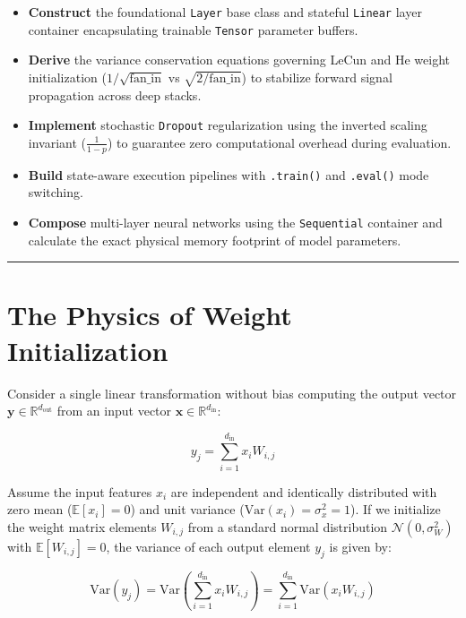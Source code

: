 \documentclass[
  letterpaper,
]{scrbook}
\providecommand{\tightlist}{%
  \setlength{\itemsep}{0pt}\setlength{\parskip}{0pt}}
\begin{document}
\begin{itemize}
\tightlist
\item
  \textbf{Construct} the foundational \texttt{Layer} base class and
  stateful \texttt{Linear} layer container encapsulating trainable
  \texttt{Tensor} parameter buffers.
\item
  \textbf{Derive} the variance conservation equations governing LeCun
  and He weight initialization (\(1/\sqrt{\text{fan\_in}}\) vs
  \(\sqrt{2/\text{fan\_in}}\)) to stabilize forward signal propagation
  across deep stacks.
\item
  \textbf{Implement} stochastic \texttt{Dropout} regularization using
  the inverted scaling invariant (\(\frac{1}{1-p}\)) to guarantee zero
  computational overhead during evaluation.
\item
  \textbf{Build} state-aware execution pipelines with \texttt{.train()}
  and \texttt{.eval()} mode switching.
\item
  \textbf{Compose} multi-layer neural networks using the
  \texttt{Sequential} container and calculate the exact physical memory
  footprint of model parameters.
\end{itemize}

\begin{center}\rule{0.5\linewidth}{0.5pt}\end{center}

\section{The Physics of Weight
Initialization}\label{the-physics-of-weight-initialization}

Consider a single linear transformation without bias computing the
output vector \(\mathbf{y} \in \mathbb{R}^{d_{\text{out}}}\) from an
input vector \(\mathbf{x} \in \mathbb{R}^{d_{\text{in}}}\):

\[y_j = \sum_{i=1}^{d_{\text{in}}} x_i W_{i, j}\]

Assume the input features \(x_i\) are independent and identically
distributed with zero mean (\(\mathbb{E}[x_i] = 0\)) and unit variance
(\(\text{Var}(x_i) = \sigma_x^2 = 1\)). If we initialize the weight
matrix elements \(W_{i, j}\) from a standard normal distribution
\(\mathcal{N}(0, \sigma_W^2)\) with \(\mathbb{E}[W_{i, j}] = 0\), the
variance of each output element \(y_j\) is given by:

\[\text{Var}(y_j) = \text{Var}\left(\sum_{i=1}^{d_{\text{in}}} x_i W_{i, j}\right) = \sum_{i=1}^{d_{\text{in}}} \text{Var}(x_i W_{i, j})\]
\end{document}
